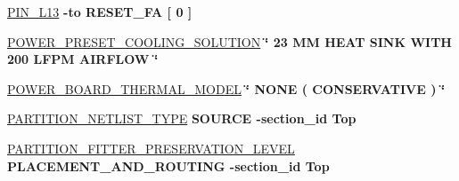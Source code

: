 \begin{DoxyCompactItemize}
\item 
\hyperlink{_d_e0___n_a_n_o___v_f_8qsf_a210b7c61b1c3fa00c3fd1d5b618ed2f1}{P\+I\+N\+\_\+\+L13} {\bfseries \textcolor{vhdlchar}{-\/}\textcolor{keywordflow}{to}\textcolor{vhdlchar}{ }\textcolor{vhdlchar}{R\+E\+S\+E\+T\+\_\+\+F\+A}\textcolor{vhdlchar}{ }\textcolor{vhdlchar}{\mbox{[}}\textcolor{vhdlchar}{ } \textcolor{vhdldigit}{0} \textcolor{vhdlchar}{ }\textcolor{vhdlchar}{\mbox{]}}\textcolor{vhdlchar}{ }} 
\item 
\hyperlink{_d_e0___n_a_n_o___v_f_8qsf_aa84732aefdcb2a7e0c581e7a180199f0}{P\+O\+W\+E\+R\+\_\+\+P\+R\+E\+S\+E\+T\+\_\+\+C\+O\+O\+L\+I\+N\+G\+\_\+\+S\+O\+L\+U\+T\+I\+O\+N} {\bfseries \textcolor{vhdlchar}{\char`\"{}}\textcolor{vhdlchar}{ } \textcolor{vhdldigit}{23} \textcolor{vhdlchar}{ }\textcolor{vhdlchar}{M\+M}\textcolor{vhdlchar}{ }\textcolor{vhdlchar}{H\+E\+A\+T}\textcolor{vhdlchar}{ }\textcolor{vhdlchar}{S\+I\+N\+K}\textcolor{vhdlchar}{ }\textcolor{keywordflow}{W\+I\+T\+H}\textcolor{vhdlchar}{ } \textcolor{vhdldigit}{200} \textcolor{vhdlchar}{ }\textcolor{vhdlchar}{L\+F\+P\+M}\textcolor{vhdlchar}{ }\textcolor{vhdlchar}{A\+I\+R\+F\+L\+O\+W}\textcolor{vhdlchar}{ }\textcolor{vhdlchar}{\char`\"{}}\textcolor{vhdlchar}{ }} 
\item 
\hyperlink{_d_e0___n_a_n_o___v_f_8qsf_a448248c4a58578f75db462bf3eb14aab}{P\+O\+W\+E\+R\+\_\+\+B\+O\+A\+R\+D\+\_\+\+T\+H\+E\+R\+M\+A\+L\+\_\+\+M\+O\+D\+E\+L} {\bfseries \textcolor{vhdlchar}{\char`\"{}}\textcolor{vhdlchar}{ }\textcolor{vhdlchar}{N\+O\+N\+E}\textcolor{vhdlchar}{ }\textcolor{vhdlchar}{(}\textcolor{vhdlchar}{ }\textcolor{vhdlchar}{C\+O\+N\+S\+E\+R\+V\+A\+T\+I\+V\+E}\textcolor{vhdlchar}{ }\textcolor{vhdlchar}{)}\textcolor{vhdlchar}{ }\textcolor{vhdlchar}{\char`\"{}}\textcolor{vhdlchar}{ }} 
\item 
\hyperlink{_d_e0___n_a_n_o___v_f_8qsf_aabc59314d1a057c3b5a7b52bc92041d9}{P\+A\+R\+T\+I\+T\+I\+O\+N\+\_\+\+N\+E\+T\+L\+I\+S\+T\+\_\+\+T\+Y\+P\+E} {\bfseries \textcolor{vhdlchar}{S\+O\+U\+R\+C\+E}\textcolor{vhdlchar}{ }\textcolor{vhdlchar}{-\/}\textcolor{vhdlchar}{section\+\_\+id}\textcolor{vhdlchar}{ }\textcolor{vhdlchar}{Top}\textcolor{vhdlchar}{ }} 
\item 
\hyperlink{_d_e0___n_a_n_o___v_f_8qsf_a32439c0cb466f1e087721048405f8221}{P\+A\+R\+T\+I\+T\+I\+O\+N\+\_\+\+F\+I\+T\+T\+E\+R\+\_\+\+P\+R\+E\+S\+E\+R\+V\+A\+T\+I\+O\+N\+\_\+\+L\+E\+V\+E\+L} {\bfseries \textcolor{vhdlchar}{P\+L\+A\+C\+E\+M\+E\+N\+T\+\_\+\+A\+N\+D\+\_\+\+R\+O\+U\+T\+I\+N\+G}\textcolor{vhdlchar}{ }\textcolor{vhdlchar}{-\/}\textcolor{vhdlchar}{section\+\_\+id}\textcolor{vhdlchar}{ }\textcolor{vhdlchar}{Top}\textcolor{vhdlchar}{ }} 

\end{DoxyCompactItemize}
